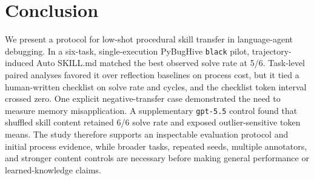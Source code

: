 \section{Conclusion}
\label{sec:conclusion}

We present a protocol for low-shot procedural skill transfer in language-agent
debugging. In a six-task, single-execution PyBugHive \texttt{black} pilot,
trajectory-induced Auto SKILL.md matched the best observed solve rate at 5/6.
Task-level paired analyses favored it over reflection baselines on process
cost, but it tied a human-written checklist on solve rate and cycles, and the
checklist token interval crossed zero. One explicit negative-transfer case
demonstrated the need to measure memory misapplication. A supplementary
\texttt{gpt-5.5} control found that shuffled skill content retained 6/6 solve
rate and exposed outlier-sensitive token means. The study therefore supports
an inspectable evaluation protocol and initial process evidence, while broader
tasks, repeated seeds, multiple annotators, and stronger content controls are
necessary before making general performance or learned-knowledge claims.
